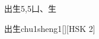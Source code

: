 \begin{entry}{出生}{5,5}{⼐、⽣}
  \begin{phonetics}{出生}{chu1sheng1}[][HSK 2]
  \end{phonetics}
\end{entry}
